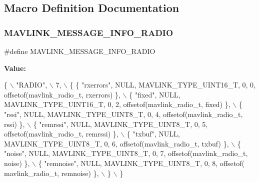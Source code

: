 \subsection{Macro Definition Documentation}
\mbox{\label{mavlink__msg__radio_8h_a9638a028b64418299b46114e8e4bfb51}} 
\subsubsection{M\+A\+V\+L\+I\+N\+K\+\_\+\+M\+E\+S\+S\+A\+G\+E\+\_\+\+I\+N\+F\+O\+\_\+\+R\+A\+D\+IO}
{\footnotesize\ttfamily \#define M\+A\+V\+L\+I\+N\+K\+\_\+\+M\+E\+S\+S\+A\+G\+E\+\_\+\+I\+N\+F\+O\+\_\+\+R\+A\+D\+IO}

{\bfseries Value\+:}
\begin{DoxyCode}
\{ \(\backslash\)
    \textcolor{stringliteral}{"RADIO"}, \(\backslash\)
    7, \(\backslash\)
    \{  \{ \textcolor{stringliteral}{"rxerrors"}, NULL, MAVLINK_TYPE_UINT16_T, 0, 0, offsetof(mavlink_radio_t, rxerrors) \}, \(\backslash\)
         \{ \textcolor{stringliteral}{"fixed"}, NULL, MAVLINK_TYPE_UINT16_T, 0, 2, offsetof(mavlink_radio_t, fixed) \}, \(\backslash\)
         \{ \textcolor{stringliteral}{"rssi"}, NULL, MAVLINK_TYPE_UINT8_T, 0, 4, offsetof(mavlink_radio_t, rssi) \}, \(\backslash\)
         \{ \textcolor{stringliteral}{"remrssi"}, NULL, MAVLINK_TYPE_UINT8_T, 0, 5, offsetof(mavlink_radio_t, remrssi) \}, \(\backslash\)
         \{ \textcolor{stringliteral}{"txbuf"}, NULL, MAVLINK_TYPE_UINT8_T, 0, 6, offsetof(mavlink_radio_t, txbuf) \}, \(\backslash\)
         \{ \textcolor{stringliteral}{"noise"}, NULL, MAVLINK_TYPE_UINT8_T, 0, 7, offsetof(mavlink_radio_t, noise) \}, \(\backslash\)
         \{ \textcolor{stringliteral}{"remnoise"}, NULL, MAVLINK_TYPE_UINT8_T, 0, 8, offsetof(
      mavlink_radio_t, remnoise) \}, \(\backslash\)
         \} \(\backslash\)
\}
\end{DoxyCode}
\mbox{\label{mavlink__msg__radio_8h_a9254a4d9e169dbe16bacaadbabcebaac}} 
